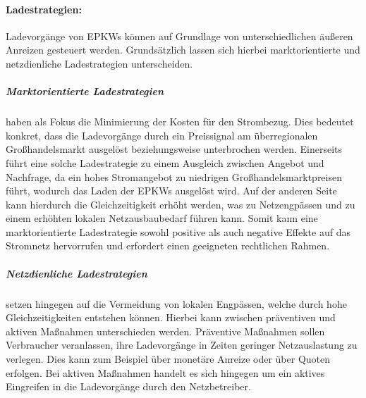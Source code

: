 


\paragraph{Ladestrategien:}

Ladevorgänge von \glspl{EPKW} können auf Grundlage von unterschiedlichen äußeren Anreizen gesteuert werden.
Grundsätzlich lassen sich hierbei marktorientierte und netzdienliche Ladestrategien unterscheiden.


\subparagraph{Marktorientierte Ladestrategien} haben als Fokus die Minimierung der Kosten für den Strombezug. Dies bedeutet konkret, dass die Ladevorgänge durch ein Preissignal am überregionalen Großhandelsmarkt ausgelöst beziehungsweise unterbrochen werden.
Einerseits führt eine solche Ladestrategie zu einem Ausgleich zwischen Angebot und Nachfrage, da ein hohes Stromangebot zu niedrigen Großhandelsmarktpreisen führt, wodurch das Laden der \glspl{EPKW} ausgelöst wird.
Auf der anderen Seite kann hierdurch die Gleichzeitigkeit erhöht werden, was zu Netzengpässen und zu einem erhöhten lokalen Netzausbaubedarf führen kann.
Somit kann eine marktorientierte Ladestrategie sowohl positive als auch negative Effekte auf das Stromnetz hervorrufen und erfordert einen geeigneten rechtlichen Rahmen. \cite{Agora2019} \cite{Dorendorf2019} \cite{Rehtanz2017}


\subparagraph{Netzdienliche Ladestrategien} setzen hingegen auf die Vermeidung von lokalen Engpässen, welche durch hohe Gleichzeitigkeiten entstehen können.
Hierbei kann zwischen präventiven und aktiven Maßnahmen unterschieden werden.
Präventive Maßnahmen sollen Verbraucher veranlassen, ihre Ladevorgänge in Zeiten geringer Netzauslastung zu verlegen.
Dies kann zum Beispiel über monetäre Anreize oder über Quoten erfolgen.
Bei aktiven Maßnahmen handelt es sich hingegen um ein aktives Eingreifen in die Ladevorgänge durch den Netzbetreiber. \cite{Agora2019}


\clearpage
